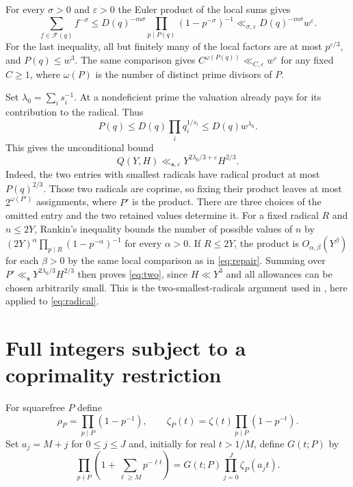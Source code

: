 \documentclass[11pt,reqno]{amsart}
\newcommand{\eps}{\varepsilon}
\newcommand{\sord}{\boldsymbol{s}}
\begin{document}
For every \(\sigma>0\) and \(\eps>0\) the Euler product of the local sums
gives
\begin{equation}\label{eq:repair}
  \sum_{f\in\mathcal F(q)} f^{-\sigma}
    \le D(q)^{-m\sigma}\prod_{p\mid P(q)}(1-p^{-\sigma})^{-1}
    \ll_{\sigma,\eps} D(q)^{-m\sigma}w^\eps.
\end{equation}
For the last inequality, all but finitely many of the local factors are
at most \(p^{\eps/3}\), and \(P(q)\le w^3\). The same comparison gives
\(C^{\omega(P(q))}\ll_{C,\eps} w^\eps\) for any fixed \(C\ge1\), where
\(\omega(P)\) is the number of distinct prime divisors of \(P\).

Set \(\lambda_0=\sum_i s_i^{-1}\). At a nondeficient prime the valuation
already pays for its contribution to the radical. Thus
\begin{equation}\label{eq:radical}
  P(q)\le D(q)\prod_i q_i^{1/s_i}\le D(q)w^{\lambda_0}.
\end{equation}
This gives the unconditional bound
\begin{equation}\label{eq:two}
 Q(Y,H)\ll_{\sord,\eps}Y^{2\lambda_0/3+\eps}H^{2/3}.
\end{equation}
Indeed, the two entries with smallest radicals have radical product at
most \(P(q)^{2/3}\). Those two radicals are coprime, so fixing their
product leaves at most \(2^{\omega(P')}\) assignments, where \(P'\) is
the product. There are three choices of the omitted entry and the two
retained values determine it. For a fixed radical \(R\) and \(n\le 2Y\),
Rankin's inequality bounds the number of possible values of \(n\) by
\((2Y)^\alpha\prod_{p\mid R}(1-p^{-\alpha})^{-1}\) for every
\(\alpha>0\). If \(R\le 2Y\), the product is \(O_{\alpha,\beta}(Y^\beta)\)
for each \(\beta>0\) by the same local comparison as in
\eqref{eq:repair}. Summing over \(P'\ll_{\sord}Y^{2\lambda_0/3}H^{2/3}\)
then proves \eqref{eq:two}, since \(H\ll Y^3\) and all allowances can
be chosen arbitrarily small. This is the two-smallest-radicals argument
used in \cite[Proposition~1.1]{BBLT}, here applied to \eqref{eq:radical}.

\section{Full integers subject to a coprimality restriction}\label{sec:single}

For squarefree \(P\) define
\[
  \rho_P=\prod_{p\mid P}(1-p^{-1}),\qquad
  \zeta_P(t)=\zeta(t)\prod_{p\mid P}(1-p^{-t}).
\]
Set \(a_j=M+j\) for \(0\le j\le J\) and, initially for real \(t>1/M\),
define \(G(t;P)\) by
\begin{equation}\label{eq:euler}
  \prod_{p\nmid P}\left(1+\sum_{\ell\ge M} p^{-\ell t}\right)
   =G(t;P)\prod_{j=0}^J\zeta_P(a_jt).
\end{equation}
\end{document}
